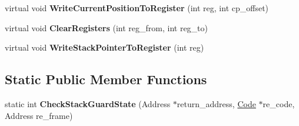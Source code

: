 \begin{DoxyCompactItemize}
\item 
virtual void {\bfseries Write\+Current\+Position\+To\+Register} (int reg, int cp\+\_\+offset)\hypertarget{classv8_1_1internal_1_1_reg_exp_macro_assembler_x87_a35a2b2829e6207464728d2c9357fd6c6}{}\label{classv8_1_1internal_1_1_reg_exp_macro_assembler_x87_a35a2b2829e6207464728d2c9357fd6c6}

\item 
virtual void {\bfseries Clear\+Registers} (int reg\+\_\+from, int reg\+\_\+to)\hypertarget{classv8_1_1internal_1_1_reg_exp_macro_assembler_x87_aea13c94917bb5b6492fbed3cea001b64}{}\label{classv8_1_1internal_1_1_reg_exp_macro_assembler_x87_aea13c94917bb5b6492fbed3cea001b64}

\item 
virtual void {\bfseries Write\+Stack\+Pointer\+To\+Register} (int reg)\hypertarget{classv8_1_1internal_1_1_reg_exp_macro_assembler_x87_ad3d41ed6f7469629095b35b1e29d190f}{}\label{classv8_1_1internal_1_1_reg_exp_macro_assembler_x87_ad3d41ed6f7469629095b35b1e29d190f}

\end{DoxyCompactItemize}
\subsection*{Static Public Member Functions}
\begin{DoxyCompactItemize}
\item 
static int {\bfseries Check\+Stack\+Guard\+State} (Address $\ast$return\+\_\+address, \hyperlink{classv8_1_1internal_1_1_code}{Code} $\ast$re\+\_\+code, Address re\+\_\+frame)\hypertarget{classv8_1_1internal_1_1_reg_exp_macro_assembler_x87_acf27cabd53da07c1781cd6d8163de25d}{}\label{classv8_1_1internal_1_1_reg_exp_macro_assembler_x87_acf27cabd53da07c1781cd6d8163de25d}

\end{DoxyCompactItemize}
